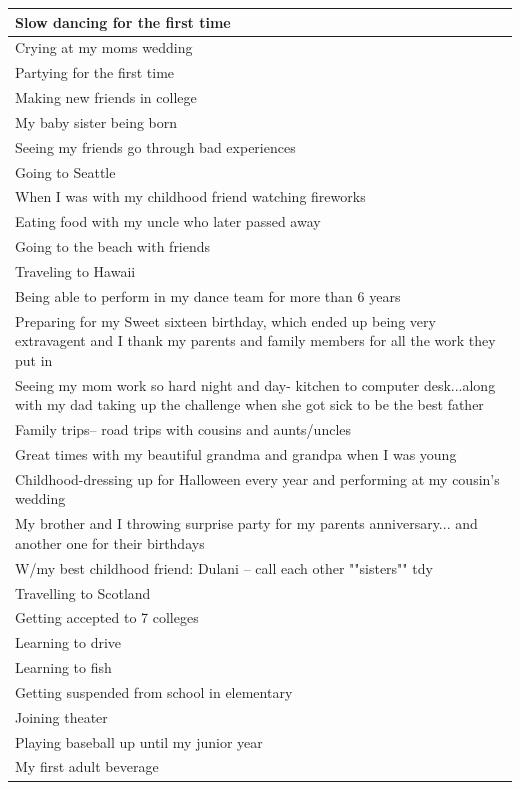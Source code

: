 \documentclass[
  .7em,
  letterpaper,
  DIV=11,
  numbers=noendperiod]{scrartcl}
\begin{document}
\begin{table}
\begin{tabular}{l}
\hline
Slow dancing for the first time\\
\hline
Crying at my moms wedding\\
\hline
Partying for the first time\\
\hline
Making new friends in college\\
\hline
My baby sister being born\\
\hline
Seeing my friends go through bad experiences\\
\hline
Going to Seattle\\
\hline
When I was with my childhood friend watching fireworks\\
\hline
Eating food with my uncle who later passed away\\
\hline
Going to the beach with friends\\
\hline
Traveling to Hawaii\\
\hline
Being able to perform in my dance team for more than 6 years\\
\hline
Preparing for my Sweet sixteen birthday, which ended up being very extravagent and I thank my parents and family members for all the work they put in\\
\hline
Seeing my mom work so hard night and day- kitchen to computer desk...along with my dad taking up the challenge when she got sick to be the best father\\
\hline
Family trips-- road trips with cousins and aunts/uncles\\
\hline
Great times with my beautiful grandma and grandpa when I was young\\
\hline
Childhood-dressing up for Halloween every year and performing at my cousin's wedding\\
\hline
My brother and I throwing surprise party for my parents anniversary... and another one for their birthdays\\
\hline
W/my best childhood friend: Dulani -- call each other ""sisters"" tdy\\
\hline
Travelling to Scotland\\
\hline
Getting accepted to 7 colleges\\
\hline
Learning to drive\\
\hline
Learning to fish\\
\hline
Getting suspended from school in elementary\\
\hline
Joining theater\\
\hline
Playing baseball up until my junior year\\
\hline
My first adult beverage\\

\end{tabular}
\end{table}
\end{document}
